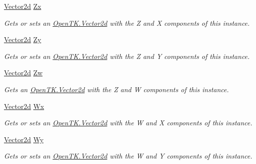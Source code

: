 \begin{DoxyCompactItemize}
\hyperlink{struct_open_t_k_1_1_vector2d}{Vector2d} \hyperlink{struct_open_t_k_1_1_vector4d_a4ba315f735bff80292c71d825f709923}{Zx}
\begin{DoxyCompactList}\small\item\em Gets or sets an \hyperlink{struct_open_t_k_1_1_vector2d}{Open\-T\-K.\-Vector2d} with the Z and X components of this instance. \end{DoxyCompactList}\item 
\hyperlink{struct_open_t_k_1_1_vector2d}{Vector2d} \hyperlink{struct_open_t_k_1_1_vector4d_adc6bfcd46528871e76a47c83fc38b0fd}{Zy}
\begin{DoxyCompactList}\small\item\em Gets or sets an \hyperlink{struct_open_t_k_1_1_vector2d}{Open\-T\-K.\-Vector2d} with the Z and Y components of this instance. \end{DoxyCompactList}\item 
\hyperlink{struct_open_t_k_1_1_vector2d}{Vector2d} \hyperlink{struct_open_t_k_1_1_vector4d_aea2374e451389525bd30e238249db5d1}{Zw}
\begin{DoxyCompactList}\small\item\em Gets an \hyperlink{struct_open_t_k_1_1_vector2d}{Open\-T\-K.\-Vector2d} with the Z and W components of this instance. \end{DoxyCompactList}\item 
\hyperlink{struct_open_t_k_1_1_vector2d}{Vector2d} \hyperlink{struct_open_t_k_1_1_vector4d_a6659b3cfd08b22fc6bd30ca60dd2b5eb}{Wx}
\begin{DoxyCompactList}\small\item\em Gets or sets an \hyperlink{struct_open_t_k_1_1_vector2d}{Open\-T\-K.\-Vector2d} with the W and X components of this instance. \end{DoxyCompactList}\item 
\hyperlink{struct_open_t_k_1_1_vector2d}{Vector2d} \hyperlink{struct_open_t_k_1_1_vector4d_a18468220fd0c64160b718b9997708435}{Wy}
\begin{DoxyCompactList}\small\item\em Gets or sets an \hyperlink{struct_open_t_k_1_1_vector2d}{Open\-T\-K.\-Vector2d} with the W and Y components of this instance. \end{DoxyCompactList}\item 

\end{DoxyCompactItemize}
